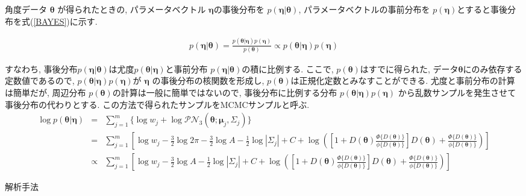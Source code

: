 \documentclass[a4j,11pt]{jarticle}
\makeatletter
\def\section{\@startsection{section}{1}{\z@}
   {0.8\Cvs \@plus.5\Cdp \@minus.2\Cdp}
   {0.2\Cvs \@plus.3\Cdp}
   {\normalfont \Large \bfseries}}
\def\subsection{\@startsection{subsection}{1}{\z@}
   {0.8\Cvs \@plus.5\Cdp \@minus.2\Cdp}
   {0.2\Cvs \@plus.3\Cdp}
   {\normalfont \normalsize \bfseries}}
\makeatother
\begin{document}
角度データ $\bm \theta$ が得られたときの, パラメータベクトル $\bm \eta$の事後分布を $p(\bm \eta| \bm \theta)$, パラメータベクトルの事前分布を $p(\bm \eta)$とすると事後分布を式(\ref{BAYES})に示す. 

\vspace{-1zh}
\begin{eqnarray}
\label{BAYES}
p(\bm \eta | \bm \theta) = \frac{p(\bm \theta | \bm \eta) p(\bm \eta)}{p(\bm \theta)} \propto p(\bm \theta | \bm \eta) p(\bm \eta)
\end{eqnarray}

\vspace{-0.5zh}
\noindent
すなわち, 事後分布$p(\bm \eta | \bm \theta)$は尤度$p(\bm \theta | \bm \eta)$と事前分布 $p(\bm \eta| \bm \theta)$の積に比例する. ここで, $p(\bm \theta)$はすでに得られた, データ$\bm \theta$にのみ依存する定数値であるので, $p(\bm \theta | \bm \eta) p(\bm \eta)$が $\bm \eta$  の事後分布の核関数を形成し, $p(\bm \theta)$は正規化定数とみなすことができる. 尤度と事前分布の計算は簡単だが, 周辺分布 $p(\bm \theta)$の計算は一般に簡単ではないので, 事後分布に比例する分布 $p(\bm \theta | \bm \eta) p(\bm \eta)$ から乱数サンプルを発生させて事後分布の代わりとする. この方法で得られたサンプルをMCMCサンプルと呼ぶ. %
\vspace{-1zh}
\begin{eqnarray}
\label{logPNS}
\log p(\bm \theta | \bm \eta) &=& \sum^m_{j=1} \{\log w_j + \log \mathcal{PN}_3(\bm \theta;\bm \mu_j, \Sigma_j)\} \nonumber \\ 
&=& \sum^m_{j=1} \left[ \log w_j - \frac{3}{2} \log 2\pi - \frac{3}{2} \log A - \frac{1}{2} \log |\Sigma_j| + C + \log \left( \left[1 + D(\bm \theta) \frac{\Phi \{D(\bm \theta)\}}{\phi \{D(\bm \theta)\}} \right] D(\bm \theta) + \frac{\Phi \{D(\bm \theta)\}}{\phi \{D(\bm \theta)\}} \right)\right] \nonumber \\
&\propto& \sum^m_{j=1} \left[ \log w_j - \frac{3}{2} \log A - \frac{1}{2} \log |\Sigma_j| + C + \log \left( \left[1 + D(\bm \theta) \frac{\Phi \{D(\bm \theta)\}}{\phi \{D(\bm \theta)\}} \right] D(\bm \theta) + \frac{\Phi \{D(\bm \theta)\}}{\phi \{D(\bm \theta)\}} \right) \right]  
\end{eqnarray}
\fi

\section{解析手法}
\end{document}
